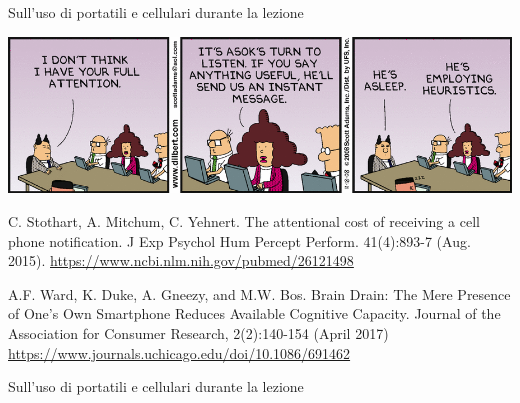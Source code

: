 \begin{frame}{Sull'uso di portatili e cellulari durante la lezione}
	
\vspace{-6pt}
\begin{center}
\includegraphics[width=1.0\textwidth]{attention.png}
\end{center}

\pause
\footnotesize
\BI
\item C. Stothart, A. Mitchum, C. Yehnert. \alert{The attentional cost of receiving a cell phone notification}. J Exp Psychol Hum Percept Perform. 41(4):893-7 (Aug. 2015).
\url{https://www.ncbi.nlm.nih.gov/pubmed/26121498}

\item A.F. Ward, K. Duke, A. Gneezy, and M.W. Bos. 
\alert{Brain Drain: The Mere Presence of One’s Own Smartphone Reduces Available Cognitive Capacity}. 
Journal of the Association for Consumer Research, 2(2):140-154 (April 2017) \\
\url{https://www.journals.uchicago.edu/doi/10.1086/691462}

\EI

\end{frame}

\begin{frame}{Sull'uso di portatili e cellulari durante la lezione}

\begin{columns}[T]


\begin{center}
\end{center}


\begin{center}
\end{center}


\begin{center}
\end{center}

\end{columns}



\end{frame}



